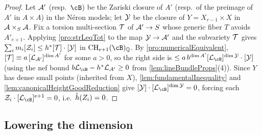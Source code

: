 \begin{proof}
  Let \(\mathcal{A}'\) (resp.\ \(\cB\)) be the Zariski closure of \(A'\) (resp.\ of the preimage of
  \(A'\) in \(A \times A\)) in the N\'eron models; let \(\mathcal{Y}\) be the closure of
  \(Y = X_{r-1} \times X\) in \(\mathcal{A} \times_S \mathcal{A}\).
  Fix a torsion multi-section \(\mathcal{T}\) of \(\mathcal{A}' \to S\) whose generic fiber \(T\) avoids
  \(A'_{e+1}\).
  Applying \cref{pro:strLeqTot} to the map \(\mathcal{Y} \to \mathcal{A}'\) and the subvariety \(\mathcal{T}\) gives
  \(\sum_i m_i[\mathcal{Z}_i] \leq h^*[\mathcal{T}]\cdot[\mathcal{Y}]\) in \(\CH_{e+1}(\cB)_{\mathbb{Q}}\).
  By \cref{pro:numericalEquivalent}, \([\mathcal{T}] \equiv a\,[\mathcal{L}_{\mathcal{A}'}]^{\dim A'}\) for some
  \(a > 0\), so the right side is \(\leq a\,b^{\dim A'}[\cL_{\cB}]^{\dim \cY}\cdot[\cY]\)
  (using the nef bound \(b\cL_{\cB} - h^*\cL_{\cA'} \geq 0\) from \cref{lem:lineBundleProps}(4)).
  Since \(Y\) has dense small points (inherited from \(X\)), \cref{lem:fundamentalInequality}
  and \cref{lem:canonicalHeightGoodReduction} give \([\cY]\cdot[\cL_{\cB}]^{\dim\cY}=0\),
  forcing each \(\mathcal{Z}_i\cdot[\cL_{\cB}]^{e+1}=0\), i.e.\ \(\hat{h}(Z_i)=0\).
\end{proof}

\subsection{Lowering the dimension}

